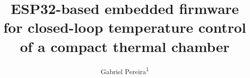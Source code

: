 \documentclass[10pt,a4paper,twocolumn,english]{article}
\title{ESP32-based embedded firmware for closed-loop temperature control of a compact thermal chamber}
\author{Gabriel Pereira\textsuperscript{1}}
\begin{document}
\twocolumn[
  \maketitle   %
]










\end{document}
